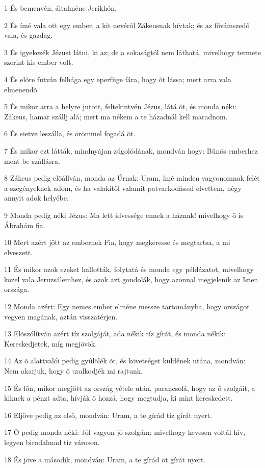\par 1 És bemenvén, általméne Jerikhón.
\par 2 És ímé vala ott egy ember, a kit nevérõl Zákeusnak hívtak; és az fõvámszedõ vala, és gazdag.
\par 3 És igyekezék Jézust látni, ki az; de a sokaságtól nem láthatá, mivelhogy termete szerint kis ember volt.
\par 4 És elõre futván felhága egy eperfüge fára, hogy õt lássa; mert arra vala elmenendõ.
\par 5 És mikor arra a helyre jutott, feltekintvén Jézus, látá õt, és monda néki: Zákeus, hamar szállj alá; mert ma nékem a te házadnál kell maradnom.
\par 6 És sietve leszálla, és örömmel fogadá õt.
\par 7 És mikor ezt látták, mindnyájan zúgolódának, mondván hogy: Bûnös emberhez ment be szállásra.
\par 8 Zákeus pedig elõállván, monda az Úrnak: Uram, ímé minden vagyonomnak felét a szegényeknek adom, és ha valakitõl valamit patvarkodással elvettem, négy annyit adok helyébe.
\par 9 Monda pedig néki Jézus: Ma lett idvessége ennek a háznak! mivelhogy õ is Ábrahám fia.
\par 10 Mert azért jött az embernek Fia, hogy megkeresse és megtartsa, a mi elveszett.
\par 11 És mikor azok ezeket hallották, folytatá és monda egy példázatot, mivelhogy közel vala Jeruzsálemhez, és azok azt gondolák, hogy azonnal megjelenik az Isten országa.
\par 12 Monda azért: Egy nemes ember elméne messze tartományba, hogy országot vegyen magának, aztán visszatérjen.
\par 13 Elõszólítván azért tíz szolgáját, ada nékik tíz gírát, és monda nékik: Kereskedjetek, míg megjövök.
\par 14 Az õ alattvalói pedig gyûlölék õt, és követséget küldének utána, mondván: Nem akarjuk, hogy õ uralkodjék mi rajtunk.
\par 15 És lõn, mikor megjött az ország vétele után, parancsolá, hogy az õ szolgáit, a kiknek a pénzt adta, hívják õ hozzá, hogy megtudja, ki mint kereskedett.
\par 16 Eljöve pedig az elsõ, mondván: Uram, a te gírád tíz gírát nyert.
\par 17 Õ pedig monda néki: Jól vagyon jó szolgám; mivelhogy kevesen voltál hív, legyen birodalmad tíz városon.
\par 18 És jöve a második, mondván: Uram, a te gírád öt gírát nyert.
